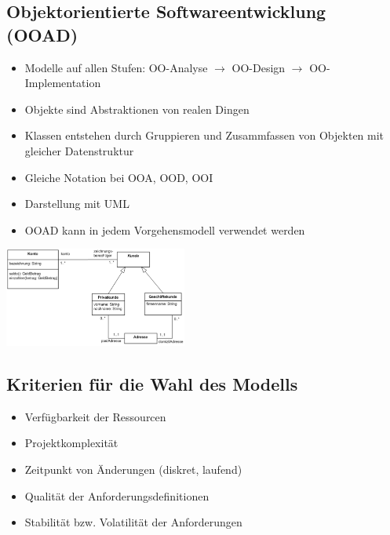 \subsection{Objektorientierte Softwareentwicklung (OOAD)}
\begin{minipage}{13cm}
	\begin{itemize}
		\item Modelle auf allen Stufen: OO-Analyse $\rightarrow$ OO-Design $\rightarrow$ OO-Implementation
		\item Objekte sind Abstraktionen von realen Dingen
		\item Klassen entstehen durch Gruppieren und Zusammfassen von Objekten mit gleicher Datenstruktur
		\item Gleiche Notation bei OOA, OOD, OOI
		\item Darstellung mit UML
		\item OOAD kann in jedem Vorgehensmodell verwendet werden
	\end{itemize}
\end{minipage}
\begin{minipage}{6cm}
	\includegraphics[width=6cm]{images/uml.png}
\end{minipage}

\subsection{Kriterien für die Wahl des Modells}
\begin{itemize}
	\item Verfügbarkeit der Ressourcen
	\item Projektkomplexität
	\item Zeitpunkt von Änderungen (diskret, laufend)
	\item Qualität der Anforderungsdefinitionen
	\item Stabilität bzw. Volatilität der Anforderungen
\end{itemize}